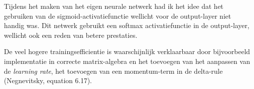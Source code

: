 \documentclass[a4paper,10pt,fleqn]{article}
\begin{document}
\begin{enumerate}[1.]
	Tijdens het maken van het eigen neurale netwerk had ik het idee dat het gebruiken van de sigmoid-activatiefunctie wellicht voor de output-layer niet handig was. Dit netwerk gebruikt een softmax activatiefunctie in de output-layer, wellicht ook een reden van betere prestaties.

	De veel hogere trainingsefficientie is waarschijnlijk verklaarbaar door bijvoorbeeld implementatie in correcte matrix-algebra en het toevoegen van het aanpassen van de \textit{learning rate}, het toevoegen van een momentum-term in de delta-rule (Negnevitsky, equation 6.17).
\end{enumerate}
\end{document}
